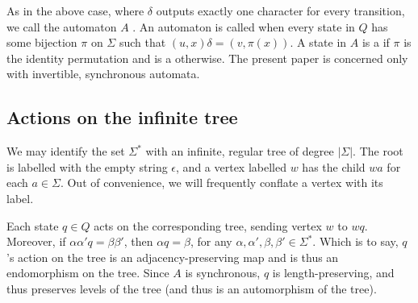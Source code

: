 \documentclass[10pt]{article}
\begin{document}
As in the above case, where $\delta$ outputs exactly one character for
every transition, we call the automaton $A$ . An
automaton is called  when every state in $Q$ has some
bijection $\pi$ on $\Sigma$ such that $(u, x)\delta = (v, \pi(x))$. A
state in $A$ is a  if $\pi$ is the identity
permutation and is a  otherwise. The present paper
is concerned only with invertible, synchronous automata.

\subsection{Actions on the infinite tree}

We may identify the set $\Sigma^*$ with an infinite, regular tree of
degree $|\Sigma|$. The root is labelled with the empty string
$\epsilon$, and a vertex labelled $w$ has the child $wa$ for each
$a \in \Sigma$. Out of convenience, we will frequently conflate a
vertex with its label.

\begin{center}
\end{center}

Each state $q \in Q$ acts on the corresponding tree, sending vertex
$w$ to $wq$. Moreover, if $\alpha \alpha' q = \beta \beta'$, then
$\alpha q = \beta$, for any
$\alpha, \alpha', \beta, \beta' \in \Sigma^*$. Which is to say, $q$'s
action on the tree is an adjacency-preserving map and is thus an
endomorphism on the tree. Since $A$ is synchronous, $q$ is
length-preserving, and thus preserves levels of the tree (and thus is
an automorphism of the tree).
\end{document}
